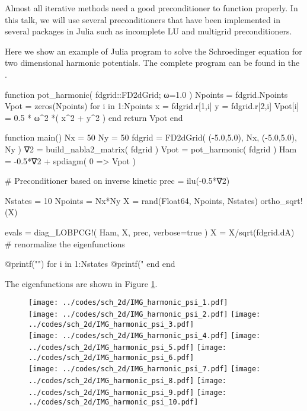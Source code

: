 Almost all iterative methods need a good preconditioner to function properly. In this
talk, we will use several preconditioners that have been implemented in several packages
in Julia such as incomplete LU and multigrid preconditioners.

Here we show an example of Julia program to solve the Schroedinger equation for two
dimensional harmonic potentials. The complete program can be found in the
.

\begin{juliacode}
function pot_harmonic( fdgrid::FD2dGrid; ω=1.0 )
    Npoints = fdgrid.Npoints
    Vpot = zeros(Npoints)
    for i in 1:Npoints
        x = fdgrid.r[1,i]
        y = fdgrid.r[2,i]
        Vpot[i] = 0.5 * ω^2 *( x^2 + y^2 )
    end
    return Vpot
end

function main()
    Nx = 50
    Ny = 50
    fdgrid = FD2dGrid( (-5.0,5.0), Nx, (-5.0,5.0), Ny )
    ∇2 = build_nabla2_matrix( fdgrid )
    Vpot = pot_harmonic( fdgrid )
    Ham = -0.5*∇2 + spdiagm( 0 => Vpot )

    # Preconditioner based on inverse kinetic
    prec = ilu(-0.5*∇2)

    Nstates = 10
    Npoints = Nx*Ny
    X = rand(Float64, Npoints, Nstates)
    ortho_sqrt!(X)
    
    evals = diag_LOBPCG!( Ham, X, prec, verbose=true )
    X = X/sqrt(fdgrid.dA) # renormalize the eigenfunctions

    @printf("\n\nEigenvalues\n")
    for i in 1:Nstates
        @printf("%
    end
end
\end{juliacode}


The eigenfunctions are shown in Figure \ref{fig:harm_2d_eigenfunctions}.

\begin{figure}[H]
{\centering
\texttt{[image: ../codes/sch\_2d/IMG\_harmonic\_psi\_1.pdf]}\\
\texttt{[image: ../codes/sch\_2d/IMG\_harmonic\_psi\_2.pdf]}%
\texttt{[image: ../codes/sch\_2d/IMG\_harmonic\_psi\_3.pdf]}\\
\texttt{[image: ../codes/sch\_2d/IMG\_harmonic\_psi\_4.pdf]}%
\texttt{[image: ../codes/sch\_2d/IMG\_harmonic\_psi\_5.pdf]}%
\texttt{[image: ../codes/sch\_2d/IMG\_harmonic\_psi\_6.pdf]}\\
\texttt{[image: ../codes/sch\_2d/IMG\_harmonic\_psi\_7.pdf]}%
\texttt{[image: ../codes/sch\_2d/IMG\_harmonic\_psi\_8.pdf]}%
\texttt{[image: ../codes/sch\_2d/IMG\_harmonic\_psi\_9.pdf]}%
\texttt{[image: ../codes/sch\_2d/IMG\_harmonic\_psi\_10.pdf]}
\par}
\label{fig:harm_2d_eigenfunctions}
\end{figure}


